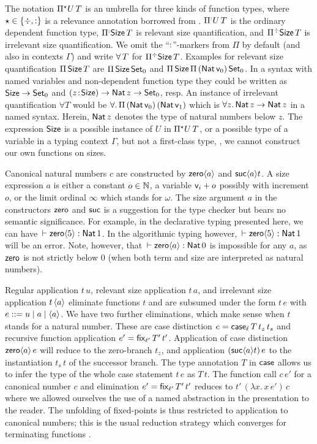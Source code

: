 \documentclass[acmsmall,screen]{acmart}\settopmatter{}
\begin{document}
The notation $\epiT U T$ is an
umbrella for three kinds of function types, where
$\evar \in \{ \erased, \noterased \}$ is a relevance annotation
borrowed from \citet{pfenning:lics01}. $\erpiT[\noterased] U T$ is
the ordinary dependent function type, $\erpiT[\noterased] \Size T$ is
relevant size quantification, and $\erpiT \Size T$ is irrelevant size
quantification.  We omit the ``$\noterased$''-markers
from $\Pi$ by default (and also in contexts $\Gamma$)
and write $\forallT T$ for $\erpiT \Size T$.
%
Examples for relevant size quantification $\piT \Size T$ are
$\piT \Size {\Set[0]}$ and
$\piT \Size {\piT {(\Nat{\ind 0})} {\Set[0]}}$.
In a syntax with named variables and non-dependent function type
they could be written as $\Size \to \Set[0]$ and
$\funT z \Size \Nat z \to \Set[0]$, resp.
%
An instance of irrelevant
quantification $\forall T$ would be
$\forall.\, \piT {(\Nat{\ind 0})} {(\Nat{\ind 1})}$
which is
$\forall z.\, \Nat z \to \Nat z$
in a named syntax.
Herein, $\Nat z$ denotes the type of natural numbers below $z$. The
expression $\Size$ is a possible instance of $U$ in $\epiT U T$, or a
possible type of a variable in a typing context $\Gamma$, but not a
first-class type, \ie, we cannot construct our own functions on sizes.

Canonical natural numbers $c$ are constructed by $\zero a$ and $\suc a t$.
A size expression $a$ is either a constant $o \in \NN$, a variable
$\ind i + o$ possibly with increment $o$, or the limit ordinal
$\infty$ which stands for $\omega$.  The size argument $a$ in the
constructors $\tzero$ and $\tsuc$
is a suggestion for the type checker but bears no
semantic significance.  For example, in the declarative typing
presented here, we can have $\der \zero 5 : \Nat 1$.
In the algorithmic typing however, $\der \zero 5 \jchk \Nat 1$ will be an error.
Note, however, that $\der \zero a : \Nat 0$ is impossible for any $a$,
as $\tzero$ is not strictly below $0$
(when both term and size are interpreted as natural numbers).

Regular application $t\,u$, relevant size application
$t\,a$, and irrelevant size application $t \, \ann a$ eliminate
functions $t$ and are subsumed under the form $t\,e$ with $e ::= u \mid a \mid \ann a$.
We have two further eliminations, which make sense when $t$ stands for a natural number.
These are case distinction
$e = \case[\ell] T {t_z}{t_s}$ and recursive function application
$e' = \fix[\ell'] {T'} {t'}$.
Application of case distinction $\zero a \, e$ will
reduce to the zero-branch $t_z$, and application $(\suc a t) \,e$ to the
instantiation $t_s\,t$ of the successor branch.  The type annotation
$T$ in $\tcase$ allows us to infer the type of the whole case
statement $t\,e$ as $T\,t$.  The function call $c\,e'$ for a canonical
number $c$ and elimination $e' = \fix[\ell'] {T'} {t'}$
reduces to $t'\,(\lambda x.\,x\,e')\,c$ where we allowed
ourselves the use of a named abstraction in the presentation to the
reader.  The unfolding of fixed-points is thus restricted to
application to canonical numbers; this is the usual reduction strategy
which converges for terminating functions \cite{gimenez:typeBased}.
\end{document}
